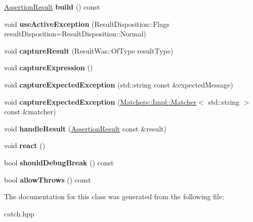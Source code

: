 \begin{DoxyCompactItemize}
\hyperlink{classCatch_1_1AssertionResult}{Assertion\+Result} {\bfseries build} () const
\item 
\mbox{\label{classCatch_1_1ResultBuilder_a5bbd2f14a678f3e8d0f791ac6d233d65}} 
void {\bfseries use\+Active\+Exception} (Result\+Disposition\+::\+Flags result\+Disposition=Result\+Disposition\+::\+Normal)
\item 
\mbox{\label{classCatch_1_1ResultBuilder_a10e467f7b7a4976e5d148b4d5066e8fd}} 
void {\bfseries capture\+Result} (Result\+Was\+::\+Of\+Type result\+Type)
\item 
\mbox{\label{classCatch_1_1ResultBuilder_af2ae2343965802eeeb0abbd4ea9d2d36}} 
void {\bfseries capture\+Expression} ()
\item 
\mbox{\label{classCatch_1_1ResultBuilder_a9ac96f6220c8dd8e4feee725c6228d77}} 
void {\bfseries capture\+Expected\+Exception} (std\+::string const \&expected\+Message)
\item 
\mbox{\label{classCatch_1_1ResultBuilder_a7d443d632eaeabe2cb36218b8dcb7400}} 
void {\bfseries capture\+Expected\+Exception} (\hyperlink{structCatch_1_1Matchers_1_1Impl_1_1Matcher}{Matchers\+::\+Impl\+::\+Matcher}$<$ std\+::string $>$ const \&matcher)
\item 
\mbox{\label{classCatch_1_1ResultBuilder_ad8bb17e4ac590b75bf8630d8f3502f4e}} 
void {\bfseries handle\+Result} (\hyperlink{classCatch_1_1AssertionResult}{Assertion\+Result} const \&result)
\item 
\mbox{\label{classCatch_1_1ResultBuilder_a3085cdc46533d45bed6f652a2ac295c0}} 
void {\bfseries react} ()
\item 
\mbox{\label{classCatch_1_1ResultBuilder_a6f2b0dbcc6cc5e0a500ac45f2534e3e7}} 
bool {\bfseries should\+Debug\+Break} () const
\item 
\mbox{\label{classCatch_1_1ResultBuilder_a0428fd78ab9e8e6f1aca6855f20fc715}} 
bool {\bfseries allow\+Throws} () const
\end{DoxyCompactItemize}


The documentation for this class was generated from the following file\+:\begin{DoxyCompactItemize}
\item 
catch.\+hpp\end{DoxyCompactItemize}
